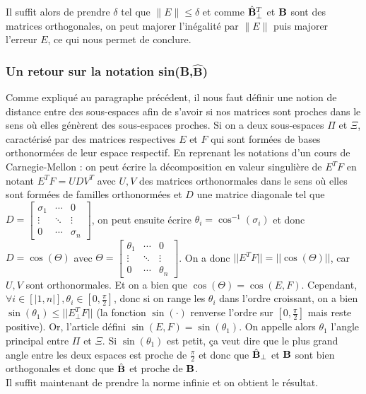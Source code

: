 \documentclass[12pt]{article}
\begin{document}
Il suffit alors de prendre $\delta$ tel que $\lVert E \rVert \leq \delta$ et comme $\hat{{\bf B}}^T_{\perp}$ et ${\bf B}$ sont des matrices orthogonales, on peut majorer l'inégalité par $\lVert E \rVert$ puis majorer l'erreur $E$, ce qui nous permet de conclure.

\subsubsection{Un retour sur la notation sin(\textbf{B},$\hat{\textbf{B}}$)}
Comme expliqué au paragraphe précédent, il nous faut définir une notion de distance entre des sous-espaces afin de s'avoir si nos matrices sont proches dans le sens où elles génèrent des sous-espaces proches. Si on a deux sous-espaces $\Pi$ et $\varXi$, caractérisé par des matrices respectives $E$ et $F$ qui sont formées de bases orthonormées de leur espace respectif. 
En reprenant les notations d'un cours de Carnegie-Mellon \cite{DAVIS_2} : on peut écrire la décomposition en valeur singulière de $E^TF$ en notant $E^TF = UDV^T$ avec $U, V$ des matrices orthonormales dans le sens où elles sont formées de familles orthonormées et $D$ une matrice diagonale tel que $D = \begin{bmatrix}
    \sigma_1 & \cdots & 0\\
    \vdots  & \ddots & \vdots\\
    0 & \cdots & \sigma_n
\end{bmatrix}$, on peut ensuite écrire $\theta_i = \cos^{-1}(\sigma_i)$ et donc $D = \cos(\Theta)$ avec $\Theta = \begin{bmatrix}
    \theta_1 & \cdots & 0\\
    \vdots  & \ddots & \vdots\\
    0 & \cdots & \theta_n
\end{bmatrix}$. On a donc $\lvert \lvert E^TF \rvert \rvert = \lvert \lvert \cos(\Theta) \rvert \rvert$, car $U, V$ sont orthonormales. Et on a bien que $\cos(\Theta) = \cos(E, F)$. Cependant, $\forall i \in [|1, n|], \theta_i \in [0, \frac{\pi}{2}]$, donc si on range les $\theta_i$ dans l'ordre croissant, on a bien $\sin(\theta_1) \leq \lvert \lvert E^T_{\perp}F \rvert \rvert$ (la fonction $\sin(\cdot)$ renverse l'ordre sur $[0, \frac{\pi}{2}]$ mais reste positive). Or, l'article défini $\sin(E, F) = \sin(\theta_1)$. On appelle alors $\theta_1$ l'angle principal entre $\Pi$ et $\varXi$. Si $\sin(\theta_1)$ est petit, ça veut dire que le plus grand angle entre les deux espaces est proche de $\frac{\pi}{2}$ et donc que $\hat{\bf B}_{\perp}$ et $\bf{B}$ sont bien orthogonales et donc que $\hat{\bf B}$ et proche de $\bf B$.\\
Il suffit maintenant de prendre la norme infinie et on obtient le résultat.\\
\end{document}
